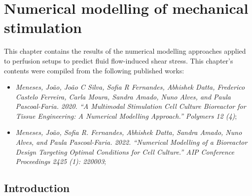 
%


\newpage
\chapter{Numerical modelling of mechanical stimulation}
This chapter contains the results of the numerical modelling approaches applied to perfusion setups to predict fluid flow-induced shear stress. This chapter's contents were compiled from the following published works:
\begin{itemize}
\item \small \textit{Meneses, João, João C Silva, Sofia R Fernandes, Abhishek Datta, Frederico Castelo Ferreira, Carla Moura, Sandra Amado, Nuno Alves, and Paula Pascoal-Faria. 2020. “A Multimodal Stimulation Cell Culture Bioreactor for Tissue Engineering: A Numerical Modelling Approach.” Polymers 12 (4)};
\item \small \textit{Meneses, João, Sofia R. Fernandes, Abhishek Datta, Sandra Amado, Nuno Alves, and Paula Pascoal-Faria. 2022. “Numerical Modelling of a Bioreactor Design Targeting Optimal Conditions for Cell Culture.” AIP Conference Proceedings 2425 (1): 220003};
\end{itemize}
\newpage




\section{Introduction}

